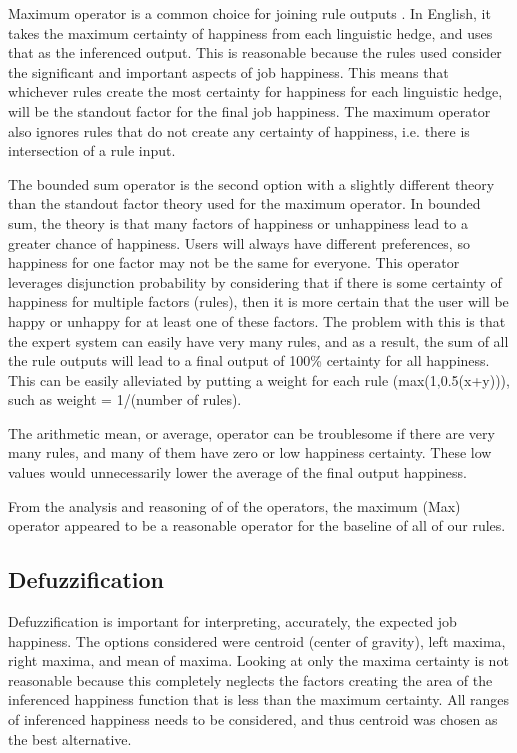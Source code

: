 \documentclass[12pt,fleqn,reqno,letterpaper]{article}
\begin{document}
Maximum operator is a common choice for joining rule outputs \cite{FAKHRI}. In English, it takes the maximum certainty of happiness from each linguistic hedge, and uses that as the inferenced output. This is reasonable because the rules used consider the significant and important aspects of job happiness. This means that whichever rules create the most certainty for happiness for each linguistic hedge, will be the standout factor for the final job happiness. The maximum operator also ignores rules that do not create any certainty of happiness, i.e. there is intersection of a rule input.

The bounded sum operator is the second option with a slightly different theory than the standout factor theory used for the maximum operator. In bounded sum, the theory is that many factors of happiness or unhappiness lead to a greater chance of happiness. Users will always have different preferences, so happiness for one factor may not be the same for everyone. This operator leverages disjunction probability by considering that if there is some certainty of happiness for multiple factors (rules), then it is more certain that the user will be happy or unhappy for at least one of these factors. The problem with this is that the expert system can easily have very many rules, and as a result, the sum of all the rule outputs will lead to a final output of 100\% certainty for all happiness. This can be easily alleviated by putting a weight for each rule (max(1,0.5(x+y))), such as weight = 1/(number of rules).

The arithmetic mean, or average, operator can be troublesome if there are very many rules, and many of them have zero or low happiness certainty. These low values would unnecessarily lower the average of the final output happiness.

From the analysis and reasoning of of the operators, the maximum (Max) operator appeared to be a reasonable operator for the baseline of all of our rules.

\subsection{Defuzzification}
Defuzzification is important for interpreting, accurately, the expected job happiness. The options considered were centroid (center of gravity), left maxima, right maxima, and mean of maxima. Looking at only the maxima certainty is not reasonable because this completely neglects the factors creating the area of the inferenced happiness function that is less than the maximum certainty. All ranges of inferenced happiness needs to be considered, and thus centroid was chosen as the best alternative.
\end{document}
